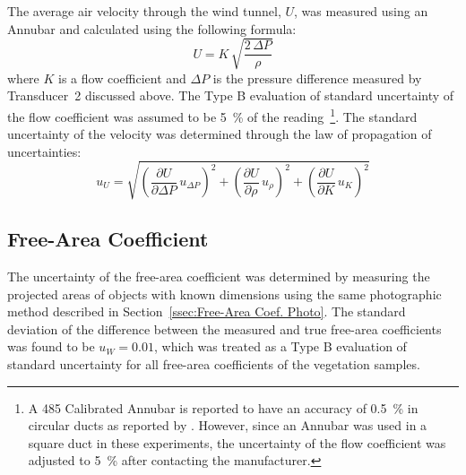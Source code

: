 \documentclass[12pt]{article}
\begin{document}
The average air velocity through the wind tunnel, $U$, was measured using an Annubar and calculated using the following formula:
\begin{equation}
\label{eq:Velocity}
U = K \, \sqrt{\frac{2 \, \Delta P}{\rho}}
\end{equation}
where $K$ is a flow coefficient and $\Delta P$ is the pressure difference measured by Transducer~2 discussed above. The Type B evaluation of standard uncertainty of the flow coefficient was assumed to be 5~\% of the reading~\footnote{A 485 Calibrated Annubar is reported to have an accuracy of 0.5~\% in circular ducts as reported by \cite{Annubar}. However, since an Annubar was used in a square duct in these experiments, the uncertainty of the flow coefficient was adjusted to 5~\% after contacting the manufacturer.}. The standard uncertainty of the velocity was determined through the law of propagation of uncertainties:
\begin{equation}
\label{eq:Velocityuncertainty}
u_{\scriptscriptstyle U} = \sqrt{{\left( \frac{\partial U}{\partial \Delta P}\,u_{\scriptscriptstyle \Delta P} \right) }^2+{\left(\frac{\partial U}{\partial \rho}\,u_{\scriptscriptstyle \rho}\right)}^2+{\left(\frac{\partial U}{\partial K}\,u_{\scriptscriptstyle K}\right)}^2}
\end{equation}

\subsection{ Free-Area Coefficient }
\label{ssec:FAACUncertainty}

The uncertainty of the free-area coefficient was determined by measuring the projected areas of objects with known dimensions using the same photographic method described in Section~\ref{ssec:Free-Area Coef. Photo}. The standard deviation of the difference between the measured and true free-area coefficients was found to be $u_{\scriptscriptstyle W}=0.01$, which was treated as a Type B evaluation of standard uncertainty for all free-area coefficients of the vegetation samples.
\end{document}
